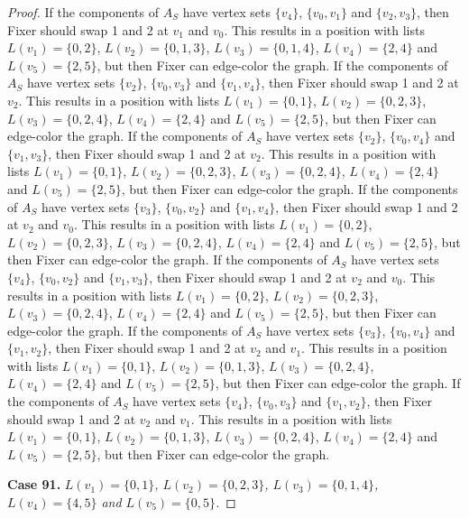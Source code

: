 \documentclass[12pt]{amsart}
\theoremstyle{plain}
\theoremstyle{definition}
\theoremstyle{remark}
\begin{document}
\begin{proof}
If the components of $A_S$ have vertex sets $\{v_4\}$, $\{v_0, v_1\}$ and $\{v_2, v_3\}$, then Fixer should swap 1 and 2 at $v_1$ and $v_0$. This results in a position with lists $L(v_1) = \{0, 2\}$, $L(v_2) = \{0, 1, 3\}$, $L(v_3) = \{0, 1, 4\}$, $L(v_4) = \{2, 4\}$ and $L(v_5) = \{2, 5\}$, but then Fixer can edge-color the graph.
If the components of $A_S$ have vertex sets $\{v_2\}$, $\{v_0, v_3\}$ and $\{v_1, v_4\}$, then Fixer should swap 1 and 2 at $v_2$. This results in a position with lists $L(v_1) = \{0, 1\}$, $L(v_2) = \{0, 2, 3\}$, $L(v_3) = \{0, 2, 4\}$, $L(v_4) = \{2, 4\}$ and $L(v_5) = \{2, 5\}$, but then Fixer can edge-color the graph.
If the components of $A_S$ have vertex sets $\{v_2\}$, $\{v_0, v_4\}$ and $\{v_1, v_3\}$, then Fixer should swap 1 and 2 at $v_2$. This results in a position with lists $L(v_1) = \{0, 1\}$, $L(v_2) = \{0, 2, 3\}$, $L(v_3) = \{0, 2, 4\}$, $L(v_4) = \{2, 4\}$ and $L(v_5) = \{2, 5\}$, but then Fixer can edge-color the graph.
If the components of $A_S$ have vertex sets $\{v_3\}$, $\{v_0, v_2\}$ and $\{v_1, v_4\}$, then Fixer should swap 1 and 2 at $v_2$ and $v_0$. This results in a position with lists $L(v_1) = \{0, 2\}$, $L(v_2) = \{0, 2, 3\}$, $L(v_3) = \{0, 2, 4\}$, $L(v_4) = \{2, 4\}$ and $L(v_5) = \{2, 5\}$, but then Fixer can edge-color the graph.
If the components of $A_S$ have vertex sets $\{v_4\}$, $\{v_0, v_2\}$ and $\{v_1, v_3\}$, then Fixer should swap 1 and 2 at $v_2$ and $v_0$. This results in a position with lists $L(v_1) = \{0, 2\}$, $L(v_2) = \{0, 2, 3\}$, $L(v_3) = \{0, 2, 4\}$, $L(v_4) = \{2, 4\}$ and $L(v_5) = \{2, 5\}$, but then Fixer can edge-color the graph.
If the components of $A_S$ have vertex sets $\{v_3\}$, $\{v_0, v_4\}$ and $\{v_1, v_2\}$, then Fixer should swap 1 and 2 at $v_2$ and $v_1$. This results in a position with lists $L(v_1) = \{0, 1\}$, $L(v_2) = \{0, 1, 3\}$, $L(v_3) = \{0, 2, 4\}$, $L(v_4) = \{2, 4\}$ and $L(v_5) = \{2, 5\}$, but then Fixer can edge-color the graph.
If the components of $A_S$ have vertex sets $\{v_4\}$, $\{v_0, v_3\}$ and $\{v_1, v_2\}$, then Fixer should swap 1 and 2 at $v_2$ and $v_1$. This results in a position with lists $L(v_1) = \{0, 1\}$, $L(v_2) = \{0, 1, 3\}$, $L(v_3) = \{0, 2, 4\}$, $L(v_4) = \{2, 4\}$ and $L(v_5) = \{2, 5\}$, but then Fixer can edge-color the graph.

\noindent\textbf{Case 91.  }\textit{$L(v_1) = \{0, 1\}$, $L(v_2) = \{0, 2, 3\}$, $L(v_3) = \{0, 1, 4\}$, $L(v_4) = \{4, 5\}$ and $L(v_5) = \{0, 5\}$.}


\end{proof}
\end{document}
